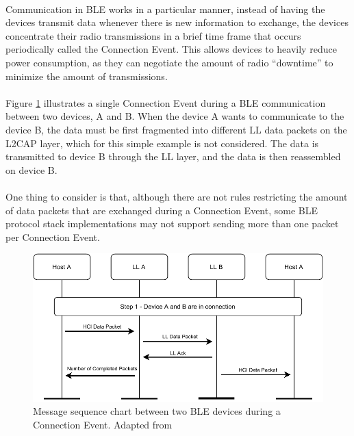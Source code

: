 \paragraph{} Communication in \acs{BLE} works in a particular manner, instead of having the devices transmit data whenever there is new information to exchange, the devices concentrate their radio transmissions in a brief time frame that occurs periodically called the Connection Event. This allows devices to heavily reduce power consumption, as they can negotiate the amount of radio ``downtime'' to minimize the amount of transmissions.

\paragraph{}  Figure \ref{fig:ble-message-sequence-chart} illustrates a single Connection Event during a \acs{BLE} communication between two devices, A and B. When the device A wants to communicate to the device B, the data must be first fragmented into different \acs{LL} data packets on the \acs{L2CAP} layer, which for this simple example is not considered. The data is transmitted to device B through the \acs{LL} layer, and the data is then reassembled on device B. 

\paragraph{} One thing to consider is that, although there are not rules restricting the amount of data packets that are exchanged during a Connection Event, some \acs{BLE} protocol stack implementations may not support sending more than one packet per Connection Event.


\begin{figure}[H]
    \centering
    \includegraphics[width=\linewidth]{images/ble-sending-data.pdf}
    \caption[Message sequence chart between two \acs{BLE} devices during a Connection Event.]{Message sequence chart between two \acs{BLE} devices during a Connection Event. Adapted from \cite{Specification1999}}
    \label{fig:ble-message-sequence-chart}
\end{figure}

